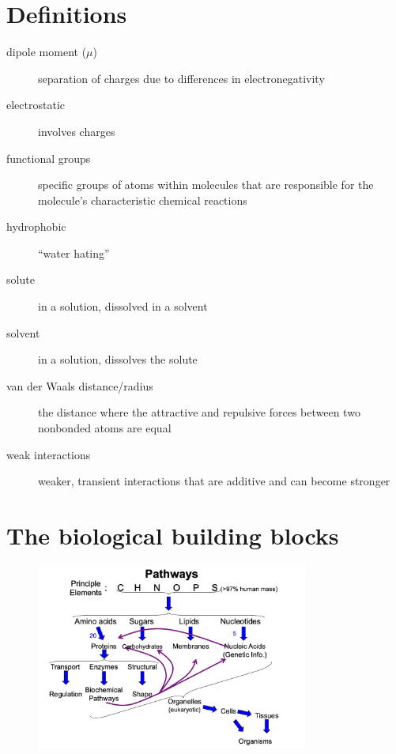 \documentclass[letterpaper, 12pt]{article}
\begin{document}
\newpage

\section*{Definitions}
\label{defs}

\begin{description}
\item [dipole moment ($\mu$)] separation of charges due to differences in electronegativity
\item [electrostatic] involves charges
\item [functional groups] specific groups of atoms within molecules that are responsible for the molecule's characteristic chemical reactions
\item [hydrophobic] ``water hating''
\item [solute] in a solution, dissolved in a solvent
\item [solvent] in a solution, dissolves the solute
\item [van der Waals distance/radius] the distance where the attractive and repulsive forces between two nonbonded atoms are equal
\item [weak interactions] weaker, transient interactions that are additive and can become stronger
\end{description}

\newpage

\section*{The biological building blocks}

\begin{figure}[H]
\centering
\includegraphics[width=0.8\textwidth]{pathways}
\end{figure}
\end{document}
